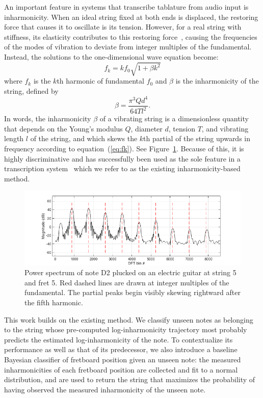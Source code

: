 \documentclass[convention,peer-reviewed]{aesconf}
\begin{document}
An important feature in systems that transcribe tablature from audio input is inharmonicity. When an ideal string fixed at both ends is displaced, the restoring force that causes it to oscillate is its tension. However, for a real string with stiffness, its elasticity contributes to this restoring force~\cite{fletcher1962}, causing the frequencies of the modes of vibration to deviate from integer multiples of the fundamental. Instead, the solutions to the one-dimensional wave equation become: 
\begin{equation}
\label{eq:fk}
f_k = kf_{0}\sqrt{1+\beta k^2}
\end{equation}
where $f_k$ is the $k$th harmonic of fundamental $f_0$ and $\beta$ is the inharmonicity of the string, defined by
\begin{equation}
\beta = \frac{\pi^3 Q d^4}{64 T l^2}. \label{eq:beta}
\end{equation}
In words, the inharmonicity $\beta$ of a vibrating string is a dimensionless quantity that depends on the Young's modulus $Q$, diameter $d$, tension $T$, and vibrating length $l$ of the string, and which skews the $k$th partial of the string upwards in frequency according to equation~(\ref{eq:fk}). See Figure~\ref{fig:skew}. Because of this, it is highly discriminative and has successfully been used as the sole feature in a transcription system~\cite{barbanchoi2012} which we refer to as the existing inharmonicity-based method.
\begin{figure}[!htbp]
\centering
\includegraphics[scale=0.3]{skew}
\caption{Power spectrum of note D2 plucked on an electric guitar at string 5 and fret 5. Red dashed lines are drawn at integer multiples of the fundamental. The partial peaks begin visibly skewing rightward after the fifth harmonic.}
\label{fig:skew}
\end{figure}

This work builds on the existing method. We classify unseen notes as belonging to the string whose pre-computed log-inharmonicity trajectory most probably predicts the estimated log-inharmonicity of the note. To contextualize its performance as well as that of its predecessor, we also introduce a baseline Bayesian classifier of fretboard position given an unseen note: the measured inharmonicities of each fretboard position are collected and fit to a normal distribution, and are used to return the string that maximizes the probability of having observed the measured inharmonicity of the unseen note.
\end{document}
